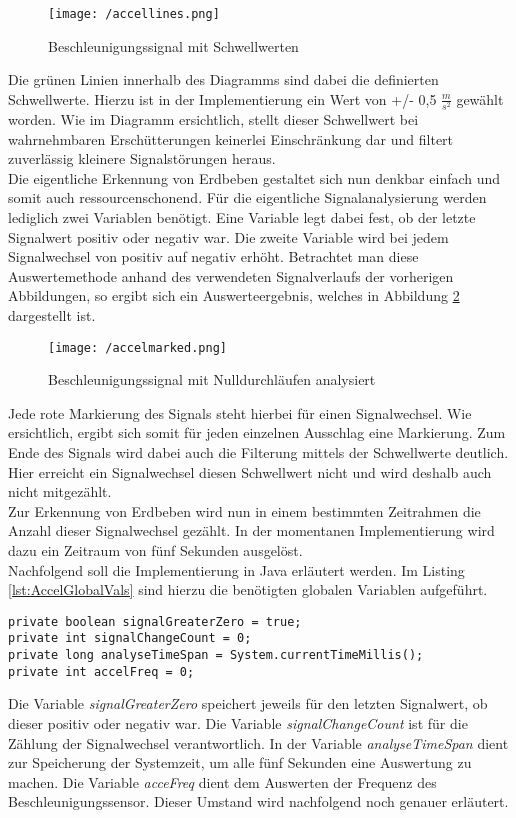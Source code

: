 \begin{figure}[H]
\centering
\texttt{[image: /accellines.png]}
\caption{Beschleunigungssignal mit Schwellwerten}
\label{fig:accellines}
\end{figure}
Die grünen Linien innerhalb des Diagramms sind dabei die definierten Schwellwerte. Hierzu ist in der Implementierung ein Wert von +/- 0,5 $\frac{m}{s^2}$ gewählt worden. Wie im Diagramm ersichtlich,
stellt dieser Schwellwert bei wahrnehmbaren Erschütterungen keinerlei Einschränkung dar und filtert zuverlässig kleinere Signalstörungen heraus.\\
Die eigentliche Erkennung von Erdbeben gestaltet sich nun denkbar einfach und somit auch ressourcenschonend. Für die eigentliche Signalanalysierung werden lediglich zwei Variablen benötigt. Eine Variable legt dabei fest, ob der letzte Signalwert positiv oder negativ war. Die zweite Variable wird bei jedem Signalwechsel von positiv auf negativ erhöht. Betrachtet man diese Auswertemethode anhand des verwendeten Signalverlaufs der vorherigen Abbildungen, so ergibt sich ein Auswerteergebnis, welches in Abbildung \ref{fig:accelmarked} dargestellt ist.
\begin{figure}[H]
\centering
\texttt{[image: /accelmarked.png]}
\caption{Beschleunigungssignal mit Nulldurchläufen analysiert}
\label{fig:accelmarked}
\end{figure}
Jede rote Markierung des Signals steht hierbei für einen Signalwechsel. Wie ersichtlich, ergibt sich somit für jeden einzelnen Ausschlag eine Markierung. Zum Ende des Signals wird dabei auch die Filterung mittels der Schwellwerte deutlich. Hier erreicht ein Signalwechsel diesen Schwellwert nicht und wird deshalb auch nicht mitgezählt.\\
Zur Erkennung von Erdbeben wird nun in einem bestimmten Zeitrahmen die Anzahl dieser Signalwechsel gezählt. In der momentanen Implementierung wird dazu ein Zeitraum von fünf Sekunden ausgelöst.\\
Nachfolgend soll die Implementierung in Java erläutert werden. Im Listing \ref{lst:AccelGlobalVals} sind hierzu die benötigten globalen Variablen aufgeführt.
\begin{lstlisting}[caption={Globale Variablen der Erbebenerkennung},label=lst:AccelGlobalVals]
private boolean signalGreaterZero = true;
private int signalChangeCount = 0;
private long analyseTimeSpan = System.currentTimeMillis(); 
private int accelFreq = 0;
\end{lstlisting}
Die Variable \textit{signalGreaterZero} speichert jeweils für den letzten Signalwert, ob dieser positiv oder negativ war. Die Variable \textit{signalChangeCount} ist für die Zählung der Signalwechsel verantwortlich. In der Variable \textit{analyseTimeSpan} dient zur Speicherung der Systemzeit, um alle fünf Sekunden eine Auswertung zu machen. Die Variable \textit{acceFreq} dient dem Auswerten der Frequenz des Beschleunigungssensor. Dieser Umstand wird nachfolgend noch genauer erläutert.\\
